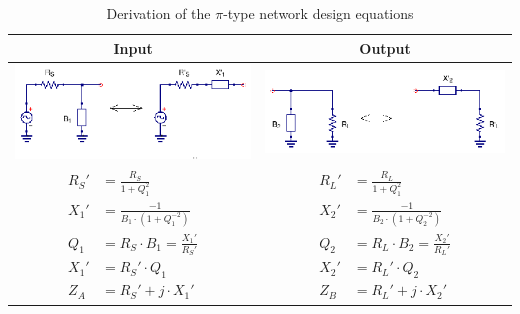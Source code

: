 \begin{table}[H]
  \centering
  \begin{tabular}{ | c | c | }
    \hline
    Input & Output\\ \hline
    \begin{minipage}{.4\textwidth}
      \includegraphics[width=\linewidth]{pi-type-input-transform}
    \end{minipage}
    &
    \begin{minipage}{.4\textwidth}
      \includegraphics[width=\linewidth]{pi-type-output-transform}
    \end{minipage}
    \\ \hline
    \begin{minipage}{.4\textwidth}
         {\begin{align}
           R_S' &= \frac{R_S}{1 + Q_1^2}\\
           X_1' &= \frac{-1}{B_1 \cdot (1 + Q_1^{-2})} \\
           Q_1 &= R_S \cdot B_1 = \frac{X_1'}{R_S'}\\
           X_1' &= R_S' \cdot Q_1\\
           Z_A &= R_S' + j\cdot X_1'
         \end{align}}
    \end{minipage}
    &
        \begin{minipage}{.4\textwidth}
         {\begin{align}
           R_L' &= \frac{R_L}{1 + Q_1^2}\\
           X_2' &= \frac{-1}{B_2 \cdot (1 + Q_2  ^{-2})} \\
           Q_2 &= R_L \cdot B_2 = \frac{X_2'}{R_L'}\\
           X_2' &= R_L' \cdot Q_2\\
           Z_B &= R_L' + j\cdot X_2'
         \end{align}}
    \end{minipage}
    \\ \hline
  \end{tabular}
  \caption{Derivation of the $\pi$-type network design equations}
  \label{tbl:pi-eqs}
\end{table}

